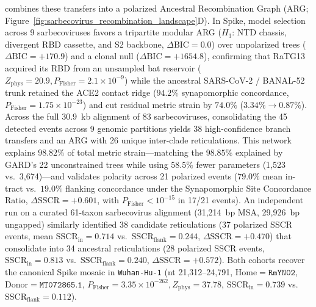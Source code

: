 \RhizAeon combines these transfers into a polarized Ancestral Recombination Graph (ARG; Figure~\ref{fig:sarbecovirus_recombination_landscape}D). In Spike, model selection across 9 sarbecoviruses favors a tripartite modular ARG ($H_3$: NTD chassis, divergent RBD cassette, and S2 backbone, $\Delta\mathrm{BIC} = 0.0$) over unpolarized trees ($\Delta\mathrm{BIC} = +170.9$) and a clonal null ($\Delta\mathrm{BIC} = +1654.8$), confirming that RaTG13 acquired its RBD from an unsampled bat reservoir ($Z_{\mathrm{phys}} = 20.9, P_{\mathrm{Fisher}} = 2.1 \times 10^{-9}$) while the ancestral SARS-CoV-2 / BANAL-52 trunk retained the ACE2 contact ridge ($94.2\%$ synapomorphic concordance, $P_{\mathrm{Fisher}} = 1.75 \times 10^{-23}$) and cut residual metric strain by $74.0\%$ ($3.34\% \to 0.87\%$). Across the full 30.9~kb alignment of 83 sarbecoviruses, consolidating the 45 detected events across 9 genomic partitions yields 38 high-confidence branch transfers and an ARG with 26 unique inter-clade reticulations. This network explains $98.82\%$ of total metric strain—matching the $98.85\%$ explained by GARD's 22 unconstrained trees while using $58.5\%$ fewer parameters (1,523 vs.\ 3,674)—and validates polarity across 21 polarized events ($79.0\%$ mean in-tract vs.\ $19.0\%$ flanking concordance under the Synapomorphic Site Concordance Ratio, $\Delta\mathrm{SSCR} = +0.601$, with $P_{\mathrm{Fisher}} < 10^{-15}$ in 17/21 events). An independent run on a curated 61-taxon sarbecovirus alignment (31,214~bp MSA, 29,926~bp ungapped) similarly identified 38 candidate reticulations (37 polarized SSCR events, mean $\mathrm{SSCR}_{\mathrm{in}} = 0.714$ vs.\ $\mathrm{SSCR}_{\mathrm{flank}} = 0.244$, $\Delta\mathrm{SSCR} = +0.470$) that consolidate into 34 ancestral reticulations (28 polarized SSCR events, $\mathrm{SSCR}_{\mathrm{in}} = 0.813$ vs.\ $\mathrm{SSCR}_{\mathrm{flank}} = 0.240$, $\Delta\mathrm{SSCR} = +0.572$). Both cohorts recover the canonical Spike mosaic in \texttt{Wuhan-Hu-1} (nt 21,312--24,791, $\mathrm{Home} = \texttt{RmYN02}$, $\mathrm{Donor} = \texttt{MT072865.1}$, $P_{\mathrm{Fisher}} = 3.35 \times 10^{-262}, Z_{\mathrm{phys}} = 37.78$, $\mathrm{SSCR}_{\mathrm{in}} = 0.739$ vs.\ $\mathrm{SSCR}_{\mathrm{flank}} = 0.112$).

